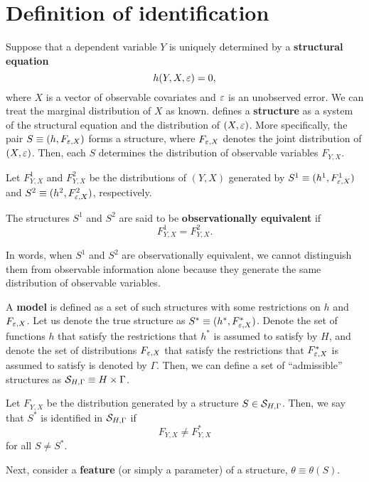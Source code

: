 \documentclass[11pt, A4paper, openany, uplatex]{book}
\begin{document}
\section{Definition of identification}

Suppose that a dependent variable $Y$ is uniquely determined by a \textbf{structural equation}
\[
	h(Y, X, \varepsilon) = 0,
\]
where $X$ is a vector of observable covariates and $\varepsilon$ is an unobserved error.
We can treat the marginal distribution of $X$ as known.
\cite{hurwicz1950generalization} defines a \textbf{structure} as a system of the structural equation and the distribution of $(X, \varepsilon)$.
More specifically, the pair $S \equiv (h, F_{\varepsilon,X})$ forms a structure, where $F_{\varepsilon,X}$ denotes the joint distribution of $(X, \varepsilon)$.
Then, each $S$ determines the distribution of observable variables $F_{Y,X}$.

Let $F^1_{Y,X}$ and $F^2_{Y,X}$ be the distributions of $(Y, X)$ generated by $S^1 \equiv (h^1, F^1_{\varepsilon,X})$ and $S^2 \equiv (h^2, F^2_{\varepsilon,X})$, respectively.

\begin{definition}
	The structures $S^1$ and $S^2$ are said to be \textbf{observationally equivalent} if
	\[
	F^1_{Y,X} = F^2_{Y,X}.
	\]
\end{definition}
In words, when $S^1$ and $S^2$ are observationally equivalent, we cannot distinguish them from observable information alone because they generate the same distribution of observable variables.

A \textbf{model} is defined as a set of such structures with some restrictions on $h$ and $F_{\varepsilon,X}$.
Let us denote the true structure as $S^* \equiv (h^*, F^*_{\varepsilon,X})$.
Denote the set of functions $h$ that satisfy the restrictions that $h^*$ is assumed to satisfy by $H$, and denote the set of distributions $F_{\varepsilon,X}$ that satisfy the restrictions that $F^*_{\varepsilon,X}$ is assumed to satisfy is denoted by $\Gamma$.
Then, we can define a set of ``admissible'' structures as $\mathcal{S}_{H,\Gamma} \equiv H \times \Gamma$.

\begin{definition}
	Let $F_{Y,X}$ be the distribution generated by a structure $S \in \mathcal{S}_{H,\Gamma}$.
	Then, we say that $S^*$ is identified in $\mathcal{S}_{H,\Gamma}$ if
	\[
	F_{Y,X} \neq F^*_{Y,X}
	\]
	for all $S \neq S^*$.
\end{definition} 

Next, consider a \textbf{feature} (or simply a parameter) of a structure, $\theta \equiv \theta(S)$.
\end{document}
